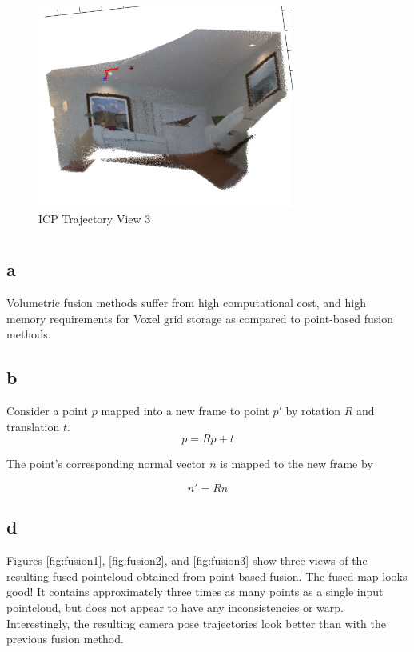 \documentclass[12pt]{article}
\begin{document}
\begin{figure}[H]
\centering
\includegraphics[page=1,width=0.75\textwidth]{2d_view3}
\caption{ ICP Trajectory View 3 } 
\label{fig:2dview3}
\end{figure}   

\section{}
\subsection{a}
Volumetric fusion methods suffer from high computational cost, and high memory requirements for Voxel grid storage as compared to point-based fusion methods.
\subsection{b}
Consider a point $p$ mapped into a new frame to point $p'$ by rotation $R$ and translation $t$.
\begin{equation}
p = R p + t
\end{equation}
  
The point's corresponding normal vector $n$ is mapped to the new frame by

\begin{equation}
n' = R n
\end{equation}

\subsection{d}
Figures \ref{fig:fusion1}, \ref{fig:fusion2}, and \ref{fig:fusion3} show three views of the resulting fused pointcloud obtained from point-based fusion. The fused map looks good! It contains  approximately three times as many points as a single input pointcloud, but does not appear to have any inconsistencies or warp. Interestingly, the resulting camera pose trajectories look better than with the previous fusion method.
\end{document}
